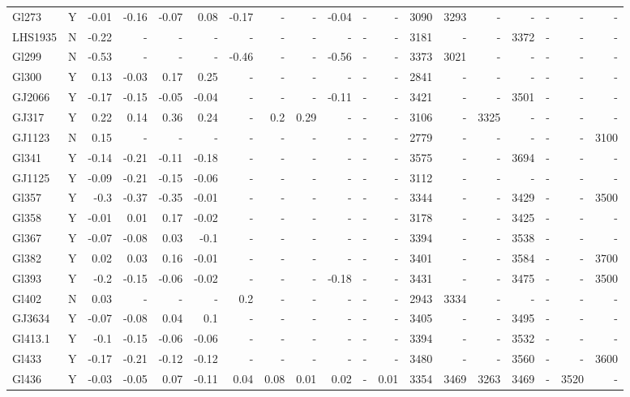 \documentclass[referee]{aa}
\begin{document}
{\begin{landscape}
{\begin{longtable}{l c r r r r r r r r r r | r r r r r r r }
Gl273 & Y & -0.01 & -0.16 & -0.07 & 0.08 & -0.17 & - & - & -0.04 & - & - & 3090 & 3293 & - & - & - & - & - \\
LHS1935 & N & -0.22 & - & - & - & - & - & - & - & - & - & 3181 & - & - & 3372 & - & - & - \\
Gl299 & N & -0.53 & - & - & - & -0.46 & - & - & -0.56 & - & - & 3373 & 3021 & - & - & - & - & - \\
Gl300 & Y & 0.13 & -0.03 & 0.17 & 0.25 & - & - & - & - & - & - & 2841 & - & - & - & - & - & - \\
GJ2066 & Y & -0.17 & -0.15 & -0.05 & -0.04 & - & - & - & -0.11 & - & - & 3421 & - & - & 3501 & - & - & - \\
GJ317 & Y & 0.22 & 0.14 & 0.36 & 0.24 & - & 0.2 & 0.29 & - & - & - & 3106 & - & 3325 & - & - & - & - \\
GJ1123 & N & 0.15 & - & - & - & - & - & - & - & - & - & 2779 & - & - & - & - & - & 3100 \\
Gl341 & Y & -0.14 & -0.21 & -0.11 & -0.18 & - & - & - & - & - & - & 3575 & - & - & 3694 & - & - & - \\
GJ1125 & Y & -0.09 & -0.21 & -0.15 & -0.06 & - & - & - & - & - & - & 3112 & - & - & - & - & - & - \\
Gl357 & Y & -0.3 & -0.37 & -0.35 & -0.01 & - & - & - & - & - & - & 3344 & - & - & 3429 & - & - & 3500 \\
Gl358 & Y & -0.01 & 0.01 & 0.17 & -0.02 & - & - & - & - & - & - & 3178 & - & - & 3425 & - & - & - \\
Gl367 & Y & -0.07 & -0.08 & 0.03 & -0.1 & - & - & - & - & - & - & 3394 & - & - & 3538 & - & - & - \\
Gl382 & Y & 0.02 & 0.03 & 0.16 & -0.01 & - & - & - & - & - & - & 3401 & - & - & 3584 & - & - & 3700 \\
Gl393 & Y & -0.2 & -0.15 & -0.06 & -0.02 & - & - & - & -0.18 & - & - & 3431 & - & - & 3475 & - & - & 3500 \\
Gl402 & N & 0.03 & - & - & - & 0.2 & - & - & - & - & - & 2943 & 3334 & - & - & - & - & - \\
GJ3634 & Y & -0.07 & -0.08 & 0.04 & 0.1 & - & - & - & - & - & - & 3405 & - & - & 3495 & - & - & - \\
Gl413.1 & Y & -0.1 & -0.15 & -0.06 & -0.06 & - & - & - & - & - & - & 3394 & - & - & 3532 & - & - & - \\
Gl433 & Y & -0.17 & -0.21 & -0.12 & -0.12 & - & - & - & - & - & - & 3480 & - & - & 3560 & - & - & 3600 \\
Gl436 & Y & -0.03 & -0.05 & 0.07 & -0.11 & 0.04 & 0.08 & 0.01 & 0.02 & - & 0.01 & 3354 & 3469 & 3263 & 3469 & - & 3520 & - \\

\end{longtable}}
\end{landscape}}
\end{document}
